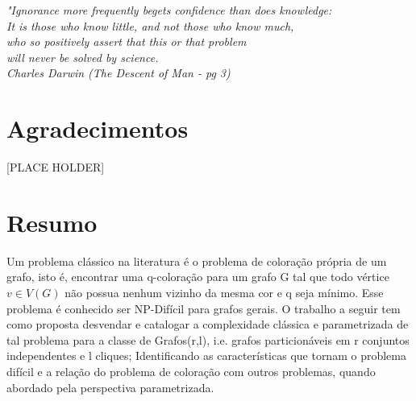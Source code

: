 \documentclass[a4paper,oneside,12pt]{book}
\begin{document}
\newpage


\newpage


\begin{flushright}
\begin{minipage}{0.5\textwidth}

\vspace{15.0cm}



\textit{"Ignorance more frequently begets confidence than does knowledge:\\
		It is those who know little, and not those who know much,\\ who so positively assert that this or that problem\\ will never be solved by science.\\
		Charles Darwin (The Descent of Man - pg 3)}
\end{minipage}
\end{flushright}


\chapter*{Agradecimentos}

\thispagestyle{myheadings}

\noindent

[PLACE HOLDER]




\chapter*{Resumo}

\thispagestyle{myheadings}

Um problema clássico na literatura é o problema de coloração própria de um grafo, isto é, encontrar uma q-coloração para um grafo G tal que todo vértice $v \in V(G)$ não possua nenhum vizinho da mesma cor e q seja mínimo. Esse problema é conhecido ser NP-Difícil para grafos gerais. O trabalho a seguir tem como proposta desvendar e catalogar a complexidade clássica e parametrizada de tal problema para a classe de Grafos(r,l), i.e. grafos particionáveis em r conjuntos independentes e l cliques; Identificando as características que tornam o problema difícil e a relação do problema de coloração com outros problemas, quando abordado pela perspectiva parametrizada.
\end{document}
